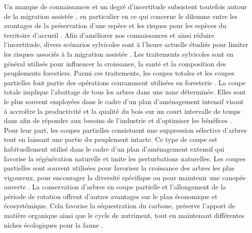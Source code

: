Un manque de connaissances et un degré d'incertitude subsistent toutefois autour de la migration assistée \citep{Park2018Informationunderload,Klenk2015assistedmigration}, 
en particulier en ce qui concerne le dilemme entre les avantages de la préservation d'une espèce et les risques pour les espèces du territoire d'accueil \citep{Hewitt2011Takingstock,McLachlan2007frameworkdebate,Vitt2010Assistedmigration}.
Afin d'améliorer nos connaissances et ainsi réduire l'incertitude, divers scénarios sylvicoles sont à l'heure actuelle étudiés pour limiter les risques associés à la migration assistée \citep{royoDesiredREgenerationAssisted2023}.
Les traitements sylvicoles sont en général utilisés pour influencer la croissance, la santé et la composition des peuplements forestiers.
Parmi ces traitements, les coupes totales et les coupes partielles font partie des opérations couramment utilisées en foresterie \citep{Ameray2021Forestcarbon,Chaudhary2016Impactforest,Man2008Elevenyearresponses,MontoroGirona2018ConiferRegeneration,PamerleauCouture2015Effectthree}. 
La coupe totale implique l'abattage de tous les arbres dans une zone déterminée.
Elles sont le plus souvent employées dans le cadre d'un plan d'aménagement intensif visant à accroître la productivité et la qualité du bois 
sur un court intervalle de temps dans afin de répondre aux besoins de l'industrie et d'optimiser les bénéfices \citep{Ameray2021Forestcarbon}.
Pour leur part, les coupes partielles consistuent une suppression sélective d'arbres tout en laissant une partie du peuplement intacte.
Ce type de coupe est habituellement utilisé dans le cadre d'un plan d'aménagement extensif qui favorise la régénération naturelle et imite les perturbations naturelles.
Les coupes partielles sont souvent utilisées pour favoriser la croissance des arbres les plus vigoureux, pour encourager la diversité spécifique ou pour maintenir une canopée ouverte \citep{Ameray2021Forestcarbon,Irland2011Timberproductivity}.
La conservation d'arbres en coupe partielle et l'allongement de la période de rotation offrent d'autres avantages sur le plan économique et écosystémique. 
Cela favorise la séquestration du carbone, préserve l'apport de matière organique ainsi que le cycle de nutriment, 
tout en maintenant différentes niches écologiques pour la faune \citep{Ameray2021Forestcarbon,Barg1999Influencepartial,Tong2020Forestmanagement}.

